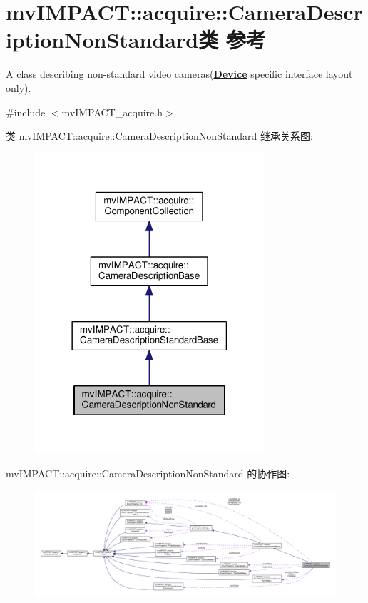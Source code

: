 \hypertarget{classmv_i_m_p_a_c_t_1_1acquire_1_1_camera_description_non_standard}{\section{mv\+I\+M\+P\+A\+C\+T\+:\+:acquire\+:\+:Camera\+Description\+Non\+Standard类 参考}
\label{classmv_i_m_p_a_c_t_1_1acquire_1_1_camera_description_non_standard}
}


A class describing non-\/standard video cameras({\bfseries \hyperlink{classmv_i_m_p_a_c_t_1_1acquire_1_1_device}{Device}} specific interface layout only).  




{\ttfamily \#include $<$mv\+I\+M\+P\+A\+C\+T\+\_\+acquire.\+h$>$}



类 mv\+I\+M\+P\+A\+C\+T\+:\+:acquire\+:\+:Camera\+Description\+Non\+Standard 继承关系图\+:
\nopagebreak
\begin{figure}[H]
\begin{center}
\leavevmode
\includegraphics[width=242pt]{classmv_i_m_p_a_c_t_1_1acquire_1_1_camera_description_non_standard__inherit__graph}
\end{center}
\end{figure}


mv\+I\+M\+P\+A\+C\+T\+:\+:acquire\+:\+:Camera\+Description\+Non\+Standard 的协作图\+:
\nopagebreak
\begin{figure}[H]
\begin{center}
\leavevmode
\includegraphics[width=350pt]{classmv_i_m_p_a_c_t_1_1acquire_1_1_camera_description_non_standard__coll__graph}
\end{center}
\end{figure}
